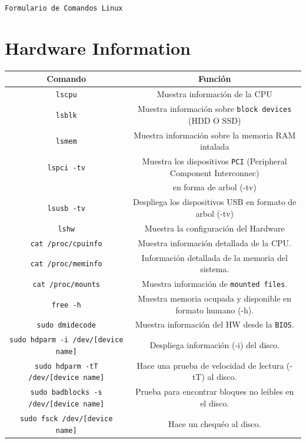 \documentclass[a4paper,10pt]{article}
\begin{document}
\begin{center}
    {\Large \texttt{Formulario de Comandos Linux}}\\
\end{center}


\section*{Hardware Information}
\begin{center}
    \begin{tabular}{| c | c |}
        \hline
        Comando & Función \\
        \hline\hline
        \texttt{lscpu} & Muestra información de la CPU \\
        \hline
        \texttt{lsblk} & Muestra información sobre \texttt{block devices} (HDD O SSD) \\
        \hline
        \texttt{lsmem} & Muestra información sobre la memoria RAM intalada \\
        \hline
        \texttt{lspci -tv} & Muestra los dispositivos \texttt{PCI} (Peripheral Component Interconnec)\\ & en forma de arbol (-tv) \\
        \hline
        \texttt{lsusb -tv} & Despliega los dispositivos USB en formato de arbol (-tv) \\
        \hline
        \texttt{lshw} & Muestra la configuración del Hardware \\
        \hline
        \texttt{cat /proc/cpuinfo} & Muestra información detallada de la CPU. \\
        \hline
        \texttt{cat /proc/meminfo} & Información detallada de la memoria del sistema. \\
        \hline
        \texttt{cat /proc/mounts} & Muestra información de \texttt{mounted files}. \\
        \hline
        \texttt{free -h} & Muestra memoria ocupada y disponible en formato humano (-h). \\
        \hline
        \texttt{sudo dmidecode} & Muestra información del HW desde la \texttt{BIOS}. \\
        \hline
        \texttt{sudo hdparm -i /dev/[device name]} & Despliega información (-i) del disco. \\
        \hline
        \texttt{sudo hdparm -tT /dev/[device name]} & Hace una prueba de velocidad de lectura (-tT) al disco. \\
        \hline
        \texttt{sudo badblocks -s /dev/[device name]} & Prueba para encontrar bloques no leibles en el disco. \\
        \hline
        \texttt{sudo fsck /dev/[device name]} & Hace un chequéo al disco. \\
        \hline
    \end{tabular}
\end{center}
\end{document}
